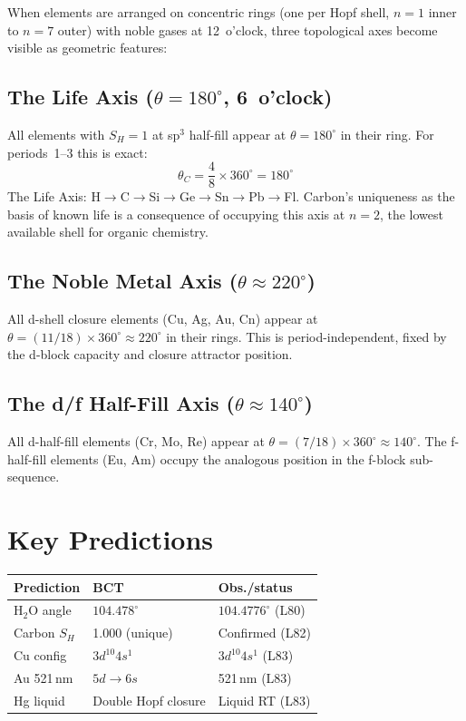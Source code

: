 \documentclass[aps,prl,twocolumn,superscriptaddress,floatfix]{revtex4-2}
\begin{document}
When elements are arranged on concentric rings (one per Hopf
shell, $n=1$ inner to $n=7$ outer) with noble gases at
12~o'clock, three topological axes become visible as geometric
features:

\subsection{The Life Axis ($\theta = 180^\circ$, 6~o'clock)}

All elements with $S_H = 1$ at sp$^3$ half-fill appear at
$\theta = 180^\circ$ in their ring.
For periods~1--3 this is exact:
\begin{equation}
  \theta_C = \frac{4}{8} \times 360^\circ = 180^\circ
\end{equation}
The Life Axis: H$\to$C$\to$Si$\to$Ge$\to$Sn$\to$Pb$\to$Fl.
Carbon's uniqueness as the basis of known life is a consequence
of occupying this axis at $n=2$, the lowest available shell
for organic chemistry.

\subsection{The Noble Metal Axis ($\theta \approx 220^\circ$)}

All d-shell closure elements (Cu, Ag, Au, Cn) appear at
$\theta = (11/18) \times 360^\circ \approx 220^\circ$
in their rings. This is period-independent, fixed by the
d-block capacity and closure attractor position.

\subsection{The d/f Half-Fill Axis ($\theta \approx 140^\circ$)}

All d-half-fill elements (Cr, Mo, Re) appear at
$\theta = (7/18) \times 360^\circ \approx 140^\circ$.
The f-half-fill elements (Eu, Am) occupy the analogous
position in the f-block sub-sequence.

\section{Key Predictions}

\begin{center}
\begin{tabular}{lll}
\toprule
Prediction & BCT & Obs./status \\
\midrule
H$_2$O angle & $104.478^\circ$ & $104.4776^\circ$ (L80) \\
Carbon $S_H$ & 1.000 (unique) & Confirmed (L82) \\
Cu config & $3d^{10}4s^1$ & $3d^{10}4s^1$ (L83) \\
Au 521\,nm & $5d{\to}6s$ & 521\,nm (L83) \\
Hg liquid & Double Hopf closure & Liquid RT (L83) \\
\bottomrule
\end{tabular}
\end{center}
\end{document}
